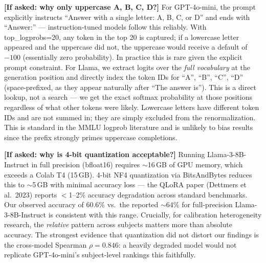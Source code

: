 \documentclass[aspectratio=169,11pt]{beamer}
\begin{document}
{  \textbf{[If asked: why only uppercase A, B, C, D?]}
  For GPT-4o-mini, the prompt explicitly instructs ``Answer with a single letter:
  A, B, C, or D'' and ends with ``Answer:'' — instruction-tuned models follow this
  reliably. With top\_logprobs=20, any token in the top 20 is captured; if a lowercase
  letter appeared and the uppercase did not, the uppercase would receive a default of
  $-100$ (essentially zero probability). In practice this is rare given the explicit
  prompt constraint.
  For Llama, we extract logits over the \emph{full vocabulary} at the generation
  position and directly index the token IDs for ``\textvisiblespace A'',
  ``\textvisiblespace B'', ``\textvisiblespace C'', ``\textvisiblespace D''
  (space-prefixed, as they appear naturally after ``The answer is'').
  This is a direct lookup, not a search — we get the exact softmax probability at
  those positions regardless of what other tokens were likely.
  Lowercase letters have different token IDs and are not summed in; they are simply
  excluded from the renormalization. This is standard in the MMLU logprob literature
  \citep{kadavath2022language} and is unlikely to bias results since the prefix
  strongly primes uppercase completions.

  \textbf{[If asked: why is 4-bit quantization acceptable?]}
  Running Llama-3-8B-Instruct in full precision (bfloat16) requires $\sim$16\,GB of
  GPU memory, which exceeds a Colab T4 (15\,GB). 4-bit NF4 quantization via
  BitsAndBytes reduces this to $\sim$5\,GB with minimal accuracy loss — the QLoRA
  paper (Dettmers et al.\ 2023) reports $<$1--2\% accuracy degradation across
  standard benchmarks. Our observed accuracy of 60.6\% vs.\ the reported $\sim$64\%
  for full-precision Llama-3-8B-Instruct is consistent with this range.
  Crucially, for calibration heterogeneity research, the \emph{relative} pattern
  across subjects matters more than absolute accuracy. The strongest evidence that
  quantization did not distort our findings is the cross-model Spearman $\rho = 0.846$:
  a heavily degraded model would not replicate GPT-4o-mini's subject-level rankings
  this faithfully.
}

\end{document}
